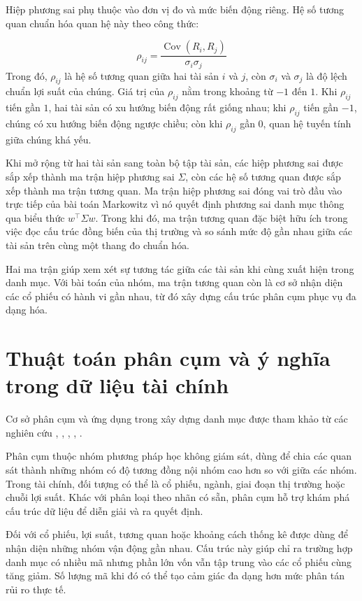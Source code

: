 \documentclass[12pt,a4paper,openany,oneside]{book}
\begin{document}
Hiệp phương sai phụ thuộc vào đơn vị đo và mức biến động riêng. Hệ số tương quan chuẩn hóa quan hệ này theo công thức:

\begin{equation}\label{eq:theory-14}
{\rho}_{ij}=\frac{\operatorname{Cov}\left({R}_{i},{R}_{j}\right)}{{\sigma}_{i}{\sigma}_{j}}
\end{equation}
Trong đó, \({\rho}_{ij}\) là hệ số tương quan giữa hai tài sản \(i\) và \(j\), còn \({\sigma}_{i}\) và \({\sigma}_{j}\) là độ lệch chuẩn lợi suất của chúng. Giá trị của \({\rho}_{ij}\) nằm trong khoảng từ \(-1\) đến \(1\). Khi \({\rho}_{ij}\) tiến gần \(1\), hai tài sản có xu hướng biến động rất giống nhau; khi \({\rho}_{ij}\) tiến gần \(-1\), chúng có xu hướng biến động ngược chiều; còn khi \({\rho}_{ij}\) gần \(0\), quan hệ tuyến tính giữa chúng khá yếu.

Khi mở rộng từ hai tài sản sang toàn bộ tập tài sản, các hiệp phương sai được sắp xếp thành ma trận hiệp phương sai \(\Sigma\), còn các hệ số tương quan được sắp xếp thành ma trận tương quan. Ma trận hiệp phương sai đóng vai trò đầu vào trực tiếp của bài toán Markowitz vì nó quyết định phương sai danh mục thông qua biểu thức \({w}^{\top}\Sigma w\). Trong khi đó, ma trận tương quan đặc biệt hữu ích trong việc đọc cấu trúc đồng biến của thị trường và so sánh mức độ gần nhau giữa các tài sản trên cùng một thang đo chuẩn hóa.

Hai ma trận giúp xem xét sự tương tác giữa các tài sản khi cùng xuất hiện trong danh mục. Với bài toán của nhóm, ma trận tương quan còn là cơ sở nhận diện các cổ phiếu có hành vi gần nhau, từ đó xây dựng cấu trúc phân cụm phục vụ đa dạng hóa.

\section{Thuật toán phân cụm và ý nghĩa trong dữ liệu tài chính}\label{Toc227188423}
Cơ sở phân cụm và ứng dụng trong xây dựng danh mục được tham khảo từ các nghiên cứu \cite{ref01}, \cite{ref06}, \cite{ref07}, \cite{ref08}, \cite{ref09}.

Phân cụm thuộc nhóm phương pháp học không giám sát, dùng để chia các quan sát thành những nhóm có độ tương đồng nội nhóm cao hơn so với giữa các nhóm. Trong tài chính, đối tượng có thể là cổ phiếu, ngành, giai đoạn thị trường hoặc chuỗi lợi suất. Khác với phân loại theo nhãn có sẵn, phân cụm hỗ trợ khám phá cấu trúc dữ liệu để diễn giải và ra quyết định.

Đối với cổ phiếu, lợi suất, tương quan hoặc khoảng cách thống kê được dùng để nhận diện những nhóm vận động gần nhau. Cấu trúc này giúp chỉ ra trường hợp danh mục có nhiều mã nhưng phần lớn vốn vẫn tập trung vào các cổ phiếu cùng tăng giảm. Số lượng mã khi đó có thể tạo cảm giác đa dạng hơn mức phân tán rủi ro thực tế.
\end{document}
